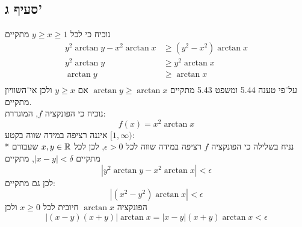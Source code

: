 \subsection{סעיף ג'}
נוכיח כי לכל $y \ge x \ge 1$ מתקיים
\begin{align*}
	y^2 \arctan y - x^2 \arctan x & \ge (y^2 - x^2) \arctan x \\
	y^2 \arctan y & \ge y^2 \arctan x \\
	\arctan y & \ge \arctan x \\
\end{align*}
על־פי טענה 5.44 ומשפט 5.43 מתקיים $\arctan y \ge \arctan x$ אם $y \ge x$ ולכן אי־השוויון מתקיים. \\
נוכיח כי הפונקציה $f$, המוגדרת:
\[
	f(x) = x^2 \arctan x
\]
איננה רציפה במידה שווה בקטע $[1, \infty)$: \\* %
נניח בשלילה כי הפונקציה $f$ רציפה במידה שווה לכל $\epsilon > 0$, לכן לכל $x, y \in \mathbb{R}$ שעבורם מתקיים $|x - y| < \delta$, מתקיים
\[
	\left| y^2 \arctan y - x^2 \arctan x \right| < \epsilon
\]
לכן גם מתקיים:
\[
	\left| (x^2 - y^2) \arctan x \right| < \epsilon
\]
הפונקציה $\arctan x$ חיובית לכל $x \ge 0$ ולכן
\[
	\left| (x - y)(x + y) \right| \arctan x = \left| x - y \right| (x + y) \arctan x < \epsilon
\]

